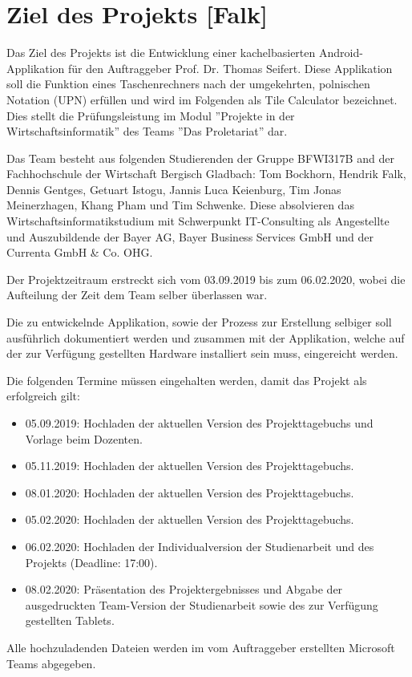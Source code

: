\section{Ziel des Projekts [Falk]}

Das Ziel des Projekts ist die Entwicklung einer kachelbasierten Android-Applikation für den Auftraggeber Prof. Dr. Thomas Seifert. Diese Applikation soll die Funktion eines Taschenrechners nach der umgekehrten, polnischen Notation (UPN) erfüllen und wird im Folgenden als Tile Calculator bezeichnet. Dies stellt die Prüfungsleistung im Modul ''Projekte in der Wirtschaftsinformatik'' des Teams ''Das Proletariat'' dar. 

Das Team besteht aus folgenden Studierenden der Gruppe BFWI317B and der Fachhochschule der Wirtschaft Bergisch Gladbach: Tom Bockhorn, Hendrik Falk, Dennis Gentges, Getuart Istogu, Jannis Luca Keienburg, Tim Jonas Meinerzhagen, Khang Pham und Tim Schwenke. Diese absolvieren das Wirtschaftsinformatikstudium mit Schwerpunkt IT-Consulting als Angestellte und Auszubildende der Bayer AG, Bayer Business Services GmbH und der Currenta GmbH \& Co. OHG.

Der Projektzeitraum erstreckt sich vom 03.09.2019 bis zum 06.02.2020, wobei die Aufteilung der Zeit dem Team selber überlassen war.

Die zu entwickelnde Applikation, sowie der Prozess zur Erstellung selbiger soll ausführlich dokumentiert werden und zusammen mit der Applikation, welche auf der zur Verfügung gestellten Hardware installiert sein muss, eingereicht werden. 

Die folgenden Termine müssen eingehalten werden, damit das Projekt als erfolgreich gilt: 

\begin{itemize}
\item 05.09.2019: Hochladen der aktuellen Version des Projekttagebuchs und Vorlage beim Dozenten.
\item 05.11.2019: Hochladen der aktuellen Version des Projekttagebuchs.
\item 08.01.2020: Hochladen der aktuellen Version des Projekttagebuchs.
\item 05.02.2020: Hochladen der aktuellen Version des Projekttagebuchs.
\item 06.02.2020: Hochladen der Individualversion der Studienarbeit und des Projekts (Deadline: 17:00).
\item 08.02.2020: Präsentation des Projektergebnisses und Abgabe der ausgedruckten Team-Version der Studienarbeit sowie des zur Verfügung gestellten Tablets.
\end{itemize}

Alle hochzuladenden Dateien werden im vom Auftraggeber erstellten Microsoft Teams abgegeben.